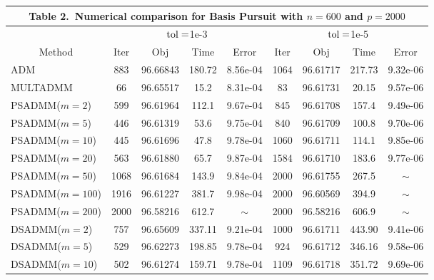 \documentclass{mcom-l}
\theoremstyle{definition}
\theoremstyle{remark}
\numberwithin{equation}{section}
\begin{document}
\begin{center}
{\scriptsize\vskip 0.1cm
\begin{tabular}{|l|| c| c| c| c|| c| c| c| c|}
\multicolumn{9}{c}{\small{Table 2.\ Numerical comparison for Basis Pursuit with $n=600$ and $p=2000$}}\\
\hline
   \multicolumn{1}{|c||}{}&\multicolumn{4}{c||}{$\hbox{tol}=$1e-3}&\multicolumn{4}{c|}{$\hbox{tol}=$1e-5} \\
\hline
   \multicolumn{1}{|c||}{\hbox{Method}}&\hbox{Iter}&\hbox{Obj}&\hbox{Time}&\hbox{Error}&\hbox{Iter}&\hbox{Obj}&\hbox{Time}&\hbox{Error} \\
\hline
ADM                 &883    & 96.66843 & 180.72    & 8.56e-04  &1064   & 96.61717 & 217.73    & 9.32e-06\\

\hline
MULTADMM            &66     & 96.65517 & 15.2      & 8.31e-04  &83     & 96.61731 & 20.15     & 9.57e-06\\
\hline
PSADMM($m=    2$)   &  599  & 96.61964 & 112.1     & 9.67e-04  & 845   & 96.61708 & 157.4     & 9.49e-06\\
PSADMM($m=    5$)   &  446  & 96.61319 & 53.6      & 9.75e-04  & 840   & 96.61709 & 100.8     & 9.70e-06\\
PSADMM($m=   10$)   &  445  & 96.61696 & 47.8      & 9.78e-04  & 1060  & 96.61711 & 114.1     & 9.85e-06\\
PSADMM($m=   20$)   &  563  & 96.61880 & 65.7      & 9.87e-04  & 1584  & 96.61710 & 183.6     & 9.77e-06\\
PSADMM($m=   50$)   & 1068  & 96.61684 & 143.9     & 9.84e-04  & 2000  & 96.61755 & 267.5     & $\sim$\\%
PSADMM($m=  100$)   & 1916  & 96.61227 & 381.7     & 9.98e-04  & 2000  & 96.60569 & 394.9     & $\sim$\\%
PSADMM($m=  200$)   & 2000  & 96.58216 & 612.7     & $\sim$    & 2000  & 96.58216 & 606.9     & $\sim$\\%
\hline
DSADMM($m=    2$)   &  757  & 96.65609 & 337.11    & 9.21e-04  & 1000  & 96.61711 & 443.90    & 9.41e-06\\
DSADMM($m=    5$)   &  529  & 96.62273 & 198.85    & 9.78e-04  &  924  & 96.61712 & 346.16    & 9.58e-06\\
DSADMM($m=   10$)   &  502  & 96.61274 & 159.71    & 9.78e-04  & 1109  & 96.61718 & 351.72    & 9.69e-06\\

\end{tabular}}
\end{center}
\end{document}
